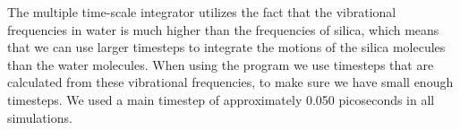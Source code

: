The multiple time-scale integrator utilizes the fact that the vibrational frequencies in water is much higher than the frequencies of silica, which means that we can use larger timesteps to integrate the motions of the silica molecules than the water molecules. When using the program we use timesteps that are calculated from these vibrational frequencies, to make sure we have small enough timesteps. We used a main timestep of approximately 0.050 picoseconds in all simulations.  %

